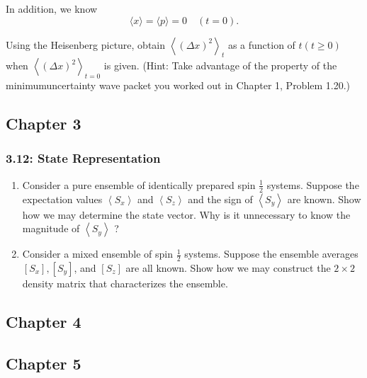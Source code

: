 \documentclass[11pt]{article}
\begin{document}
In addition, we know
$$
\langle x\rangle=\langle p\rangle=0 \quad(t=0) .
$$

Using the Heisenberg picture, obtain \(\left\langle(\Delta x)^2\right\rangle_t\) as a function of \(t(t \geq 0)\) when \(\left\langle(\Delta x)^2\right\rangle_{t=0}\) is given. (Hint: Take advantage of the property of the minimumuncertainty wave packet you worked out in Chapter 1, Problem 1.20.)
\subsection{Chapter 3}
\label{sec:org64ef16d}
\subsubsection{3.12: State Representation}
\label{sec:orga0706d8}
\begin{enumerate}
\item Consider a pure ensemble of identically prepared spin \(\frac{1}{2}\) systems.
Suppose the expectation values \(\left\langle S_x\right\rangle\) and
\(\left\langle S_z\right\rangle\) and the sign of \(\left\langle
   S_y\right\rangle\) are known. Show how we may determine the state vector. Why
is it unnecessary to know the magnitude of \(\left\langle S_y\right\rangle\) ?

\item Consider a mixed ensemble of spin \(\frac{1}{2}\) systems. Suppose the ensemble
averages \(\left[S_x\right],\left[S_y\right]\), and \(\left[S_z\right]\) are all
known. Show how we may construct the \(2 \times 2\) density matrix that
characterizes the ensemble.
\end{enumerate}
\subsection{Chapter 4}
\label{sec:org1bc5164}

\subsection{Chapter 5}
\label{sec:orgdf71420}
\end{document}
